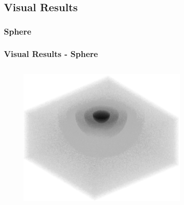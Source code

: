 \documentclass[9pt]{beamer}
\begin{document}
\subsection{Visual Results}
\subsubsection{Sphere}
\begin{frame}

\frametitle{Visual Results - Sphere}
\begin{columns}
\vspace{-2cm}
\begin{figure}
\includegraphics[width=1\textwidth]{sphere1.eps}
\end{figure}
\begin{figure}
\begin{tabular}{c c c }

\end{tabular}
\end{figure}
\end{columns}
\end{frame}
\end{document}
